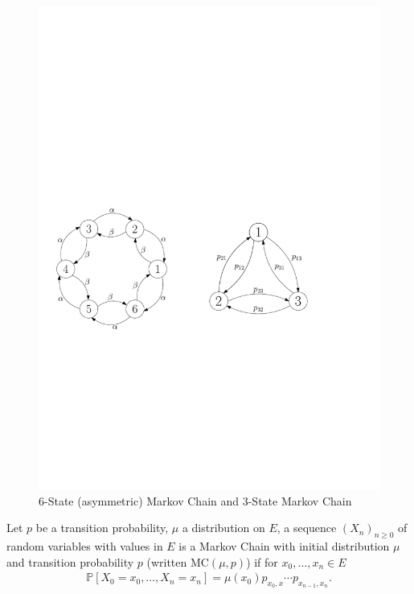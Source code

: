 \begin{figure}[!h]
	\centering
	\includegraphics[width=\textwidth]{figures/n_step_MC.pdf}
\caption{6-State (asymmetric) Markov Chain and 3-State Markov Chain}
\end{figure}

\begin{defn}
	Let $p$ be a transition probability, $\mu$ a distribution on $E$, a sequence $(X_n)_{n\geq 0}$ of random variables with values in $E $ is a Markov Chain with initial distribution $\mu$ and transition probability $p$ (written $ \textrm{MC}(\mu, p)$) if for $x_0, \ldots, x_n \in E$
\begin{align}
	\boxed{ \mathbb{P} \left[ X_0=x_0, \ldots ,X_n=x_n \right] = \mu(x_0)p_{x_0,x} \cdots p_{x_{n-1},x_{n}} }
.\end{align}
\end{defn}


